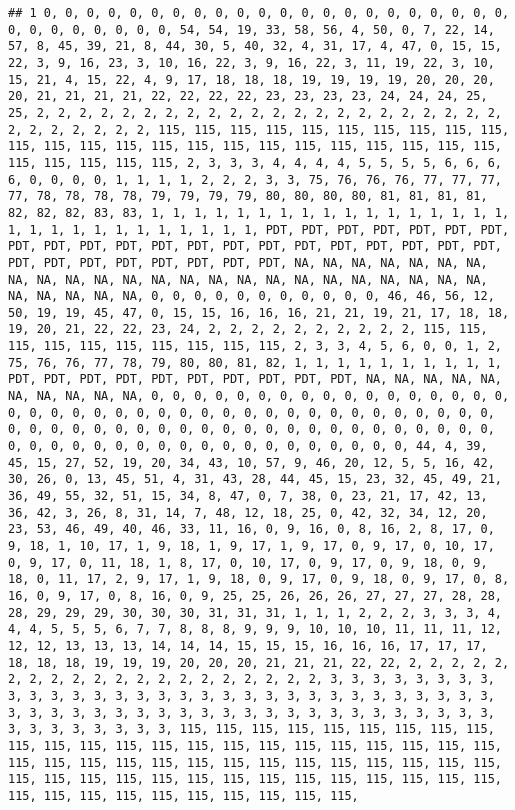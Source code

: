 \documentclass[]{article}
\begin{document}
\begin{verbatim}
## 1 0, 0, 0, 0, 0, 0, 0, 0, 0, 0, 0, 0, 0, 0, 0, 0, 0, 0, 0, 0, 0, 0, 0, 0, 0, 0, 0, 0, 0, 0, 54, 54, 19, 33, 58, 56, 4, 50, 0, 7, 22, 14, 57, 8, 45, 39, 21, 8, 44, 30, 5, 40, 32, 4, 31, 17, 4, 47, 0, 15, 15, 22, 3, 9, 16, 23, 3, 10, 16, 22, 3, 9, 16, 22, 3, 11, 19, 22, 3, 10, 15, 21, 4, 15, 22, 4, 9, 17, 18, 18, 18, 19, 19, 19, 19, 20, 20, 20, 20, 21, 21, 21, 21, 22, 22, 22, 22, 23, 23, 23, 23, 24, 24, 24, 25, 25, 2, 2, 2, 2, 2, 2, 2, 2, 2, 2, 2, 2, 2, 2, 2, 2, 2, 2, 2, 2, 2, 2, 2, 2, 2, 2, 2, 2, 2, 115, 115, 115, 115, 115, 115, 115, 115, 115, 115, 115, 115, 115, 115, 115, 115, 115, 115, 115, 115, 115, 115, 115, 115, 115, 115, 115, 115, 115, 2, 3, 3, 3, 4, 4, 4, 4, 5, 5, 5, 5, 6, 6, 6, 6, 0, 0, 0, 0, 1, 1, 1, 1, 2, 2, 2, 3, 3, 75, 76, 76, 76, 77, 77, 77, 77, 78, 78, 78, 78, 79, 79, 79, 79, 80, 80, 80, 80, 81, 81, 81, 81, 82, 82, 82, 83, 83, 1, 1, 1, 1, 1, 1, 1, 1, 1, 1, 1, 1, 1, 1, 1, 1, 1, 1, 1, 1, 1, 1, 1, 1, 1, 1, 1, 1, 1, PDT, PDT, PDT, PDT, PDT, PDT, PDT, PDT, PDT, PDT, PDT, PDT, PDT, PDT, PDT, PDT, PDT, PDT, PDT, PDT, PDT, PDT, PDT, PDT, PDT, PDT, PDT, PDT, PDT, NA, NA, NA, NA, NA, NA, NA, NA, NA, NA, NA, NA, NA, NA, NA, NA, NA, NA, NA, NA, NA, NA, NA, NA, NA, NA, NA, NA, NA, 0, 0, 0, 0, 0, 0, 0, 0, 0, 0, 0, 46, 46, 56, 12, 50, 19, 19, 45, 47, 0, 15, 15, 16, 16, 16, 21, 21, 19, 21, 17, 18, 18, 19, 20, 21, 22, 22, 23, 24, 2, 2, 2, 2, 2, 2, 2, 2, 2, 2, 115, 115, 115, 115, 115, 115, 115, 115, 115, 115, 2, 3, 3, 4, 5, 6, 0, 0, 1, 2, 75, 76, 76, 77, 78, 79, 80, 80, 81, 82, 1, 1, 1, 1, 1, 1, 1, 1, 1, 1, PDT, PDT, PDT, PDT, PDT, PDT, PDT, PDT, PDT, PDT, NA, NA, NA, NA, NA, NA, NA, NA, NA, NA, 0, 0, 0, 0, 0, 0, 0, 0, 0, 0, 0, 0, 0, 0, 0, 0, 0, 0, 0, 0, 0, 0, 0, 0, 0, 0, 0, 0, 0, 0, 0, 0, 0, 0, 0, 0, 0, 0, 0, 0, 0, 0, 0, 0, 0, 0, 0, 0, 0, 0, 0, 0, 0, 0, 0, 0, 0, 0, 0, 0, 0, 0, 0, 0, 0, 0, 0, 0, 0, 0, 0, 0, 0, 0, 0, 0, 0, 0, 0, 0, 0, 0, 44, 4, 39, 45, 15, 27, 52, 19, 20, 34, 43, 10, 57, 9, 46, 20, 12, 5, 5, 16, 42, 30, 26, 0, 13, 45, 51, 4, 31, 43, 28, 44, 45, 15, 23, 32, 45, 49, 21, 36, 49, 55, 32, 51, 15, 34, 8, 47, 0, 7, 38, 0, 23, 21, 17, 42, 13, 36, 42, 3, 26, 8, 31, 14, 7, 48, 12, 18, 25, 0, 42, 32, 34, 12, 20, 23, 53, 46, 49, 40, 46, 33, 11, 16, 0, 9, 16, 0, 8, 16, 2, 8, 17, 0, 9, 18, 1, 10, 17, 1, 9, 18, 1, 9, 17, 1, 9, 17, 0, 9, 17, 0, 10, 17, 0, 9, 17, 0, 11, 18, 1, 8, 17, 0, 10, 17, 0, 9, 17, 0, 9, 18, 0, 9, 18, 0, 11, 17, 2, 9, 17, 1, 9, 18, 0, 9, 17, 0, 9, 18, 0, 9, 17, 0, 8, 16, 0, 9, 17, 0, 8, 16, 0, 9, 25, 25, 26, 26, 26, 27, 27, 27, 28, 28, 28, 29, 29, 29, 30, 30, 30, 31, 31, 31, 1, 1, 1, 2, 2, 2, 3, 3, 3, 4, 4, 4, 5, 5, 5, 6, 7, 7, 8, 8, 8, 9, 9, 9, 10, 10, 10, 11, 11, 11, 12, 12, 12, 13, 13, 13, 14, 14, 14, 15, 15, 15, 16, 16, 16, 17, 17, 17, 18, 18, 18, 19, 19, 19, 20, 20, 20, 21, 21, 21, 22, 22, 2, 2, 2, 2, 2, 2, 2, 2, 2, 2, 2, 2, 2, 2, 2, 2, 2, 2, 2, 2, 3, 3, 3, 3, 3, 3, 3, 3, 3, 3, 3, 3, 3, 3, 3, 3, 3, 3, 3, 3, 3, 3, 3, 3, 3, 3, 3, 3, 3, 3, 3, 3, 3, 3, 3, 3, 3, 3, 3, 3, 3, 3, 3, 3, 3, 3, 3, 3, 3, 3, 3, 3, 3, 3, 3, 3, 3, 3, 3, 3, 3, 3, 115, 115, 115, 115, 115, 115, 115, 115, 115, 115, 115, 115, 115, 115, 115, 115, 115, 115, 115, 115, 115, 115, 115, 115, 115, 115, 115, 115, 115, 115, 115, 115, 115, 115, 115, 115, 115, 115, 115, 115, 115, 115, 115, 115, 115, 115, 115, 115, 115, 115, 115, 115, 115, 115, 115, 115, 115, 115, 115, 115, 115, 
\end{verbatim}
\end{document}
